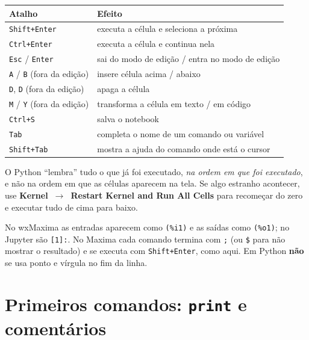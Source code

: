 \begin{center}
\begin{tabular}{@{}ll@{}}
\toprule
\textbf{Atalho} & \textbf{Efeito} \\
\midrule
\texttt{Shift+Enter} & executa a célula e seleciona a próxima \\
\texttt{Ctrl+Enter} & executa a célula e continua nela \\
\texttt{Esc} / \texttt{Enter} & sai do modo de edição / entra no modo de edição \\
\texttt{A} / \texttt{B} (fora da edição) & insere célula acima / abaixo \\
\texttt{D}, \texttt{D} (fora da edição) & apaga a célula \\
\texttt{M} / \texttt{Y} (fora da edição) & transforma a célula em texto / em código \\
\texttt{Ctrl+S} & salva o notebook \\
\texttt{Tab} & completa o nome de um comando ou variável \\
\texttt{Shift+Tab} & mostra a ajuda do comando onde está o cursor \\
\bottomrule
\end{tabular}
\end{center}

\begin{atencao}
O Python ``lembra'' tudo o que já foi executado, \emph{na ordem em que foi executado}, e não na ordem em que as
células aparecem na tela. Se algo estranho acontecer, use \textbf{Kernel~$\to$~Restart Kernel and Run All Cells}
para recomeçar do zero e executar tudo de cima para baixo.
\end{atencao}

\begin{maxima}
No wxMaxima as entradas aparecem como \texttt{(\%i1)} e as saídas como \texttt{(\%o1)}; no Jupyter são
\texttt{[1]:}. No Maxima cada comando termina com \texttt{;} (ou \texttt{\$} para não mostrar o resultado) e
se executa com \texttt{Shift+Enter}, como aqui. Em Python \textbf{não} se usa ponto e vírgula no fim da linha.
\end{maxima}

\section{Primeiros comandos: \texttt{print} e comentários}

